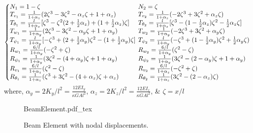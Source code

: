 \begin{equation*}
\left\{\arraycolsep=.2em\begin{array}{@{}ll}
N_1=1-\zeta&N_2=\zeta\\
T_{v_1}=\frac{1}{1+\alpha_z}(2\zeta^3-3\zeta^2-\alpha_z\zeta+1+\alpha_z)&T_{v_2}=\frac{1}{1+\alpha_z}(-2\zeta^3+3\zeta^2+\alpha_z\zeta)\\
T_{\theta_1}=\frac{l}{1+\alpha_z}[\zeta^3-\zeta^2(2+\frac{1}{2}\alpha_z)+(1+\frac{1}{2}\alpha_z)\zeta]&T_{\theta_2}=\frac{l}{1+\alpha_z}[\zeta^3-(1-\frac{1}{2}\alpha_z)\zeta^2-\frac{1}{2}\alpha_z\zeta]\\
T_{w_1}=\frac{1}{1+\alpha_y}(2\zeta^3-3\zeta^2-\alpha_y\zeta+1+\alpha_y)&T_{w_2}=\frac{1}{1+\alpha_y}(-2\zeta^3+3\zeta^2+\alpha_y\zeta)\\
T_{\psi_1}=\frac{l}{1+\alpha_y}[-\zeta^3+(2+\frac{1}{2}\alpha_y)\zeta^2-(1+\frac{1}{2}\alpha_y)\zeta]&T_{\psi_2}=\frac{l}{1+\alpha_y}(-\zeta^3+(1-\frac{1}{2}\alpha_y)\zeta^2+\frac{1}{2}\alpha_y\zeta)\\
R_{w_1}=\frac{6/l}{1+\alpha_y}(-\zeta^2+\zeta)&R_{w_2}=\frac{6/l}{1+\alpha_y}(\zeta^2-\zeta)\\
R_{\psi_1}=\frac{1}{1+\alpha_y}(3\zeta^2-(4+\alpha_y)\zeta+1+\alpha_y)&R_{\psi_2}=\frac{1}{1+\alpha_y}(3\zeta^2-(2-\alpha_y)\zeta+1+\alpha_y)\\
R_{v_1}=\frac{6/l}{1+\alpha_z}(\zeta^2-\zeta)&R_{v_2}=\frac{6/l}{1+\alpha_z}(-\zeta^2+\zeta)\\
R_{\theta_1}=\frac{1}{1+\alpha_z}(\zeta^3+3\zeta^2-(4+\alpha_z)\zeta+\alpha_z)&R_{\theta_2}=\frac{1}{1+\alpha_z}(3\zeta^2-(2-\alpha_z)\zeta)
\end{array}\right.
\end{equation*}
where, $ \alpha_y=2K_y/l^2=\frac{12EI_y}{\kappa GAl^2} $, $ \alpha_z=2K_z/l^2=\frac{12EI_z}{\kappa GAl^2} $, \& $ \zeta=x/l $
\begin{figure}
	\centering
	\def\svgwidth{400pt}
	{BeamElement.pdf_tex}
	\caption{Beam Element with nodal displacements.}
	\label{fig:BeamElem}
\end{figure}